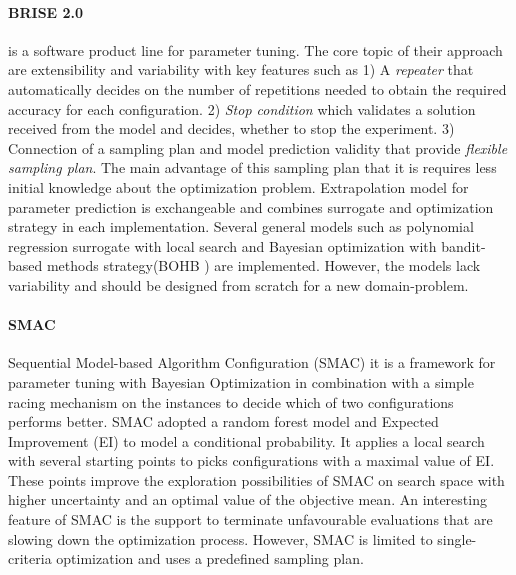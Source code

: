         \paragraph{BRISE 2.0} \cite{Pukhkaiev19} is a software product line for parameter tuning. The core topic of their approach are extensibility and variability with key features such as 1) A \emph{repeater} that automatically decides on the number of repetitions needed to obtain the required accuracy for each configuration. 2) \emph{Stop condition} which validates a solution received from the model and decides, whether to stop the experiment. 3) Connection of a sampling plan and model prediction validity that provide \emph{flexible sampling plan}. The main advantage of this sampling plan that it is requires less initial knowledge about the optimization problem.
        Extrapolation model for parameter prediction is exchangeable and combines surrogate and optimization strategy in each implementation. Several general models such as polynomial regression surrogate with local search and Bayesian optimization with bandit-based methods strategy(BOHB \cite{FalknerBOHB}) are implemented.  However, the models lack variability and should be designed from scratch for a new domain-problem.

        \paragraph{SMAC} Sequential Model-based Algorithm Configuration (SMAC)\cite{HutterHL11, smac-2017} it is a framework for parameter tuning with Bayesian Optimization in combination with a simple racing mechanism on the instances to decide which of two configurations performs better.
        SMAC adopted a random forest model and Expected Improvement (EI) to model a conditional probability. It applies a local search with several starting points to picks configurations with a maximal value of EI. These points improve the exploration possibilities of SMAC on search space with higher uncertainty and an optimal value of the objective mean. 
        An interesting feature of SMAC is the support to terminate unfavourable evaluations that are slowing down the optimization process. However, SMAC is limited to single-criteria optimization and uses a predefined sampling plan.

